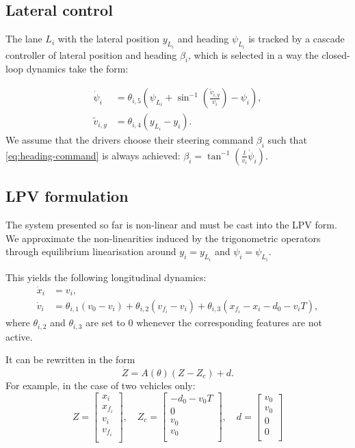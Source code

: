 \documentclass{article}
\begin{document}
\subsection{Lateral control}

The lane $L_i$ with the lateral position $y_{L_i}$ and heading $\psi_{L_i}$ is tracked by a cascade controller of lateral position and heading $\beta_i$, which is selected in a way the closed-loop dynamics take the form:

\begin{align}
	\label{eq:heading-command}
    \dot{\psi}_i &= \theta_{i,5}\left(\psi_{L_i}+\sin^{-1}\left(\frac{\tilde{v}_{i,y}}{v_i}\right)-\psi_i\right),\\
    \tilde{v}_{i,y} &= \theta_{i,4} (y_{L_i}-y_i). \nonumber
\end{align}
We assume that the drivers choose their steering command $\beta_i$ such that \eqref{eq:heading-command} is always achieved: $\beta_i = \tan^{-1}(\frac{l}{v_i}\dot{\psi}_i)$.

\subsection{LPV formulation}

The system presented so far is non-linear and must be cast into the LPV form. We approximate the non-linearities induced by the trigonometric operators through equilibrium linearisation around $y_i=y_{L_i}$ and $\psi_i=\psi_{L_i}$.

This yields the following longitudinal dynamics:
\begin{align*}
\dot{x}_i &= v_i,\\
\dot v_i &= \theta_{i,1} (v_0 - v_i) + \theta_{i,2} (v_{f_i} - v_i) + \theta_{i,3}(x_{f_i} - x_i - d_0 - v_i T),
\end{align*}
where $\theta_{i,2}$ and $\theta_{i,3}$ are set to $0$ whenever the corresponding features are not active.

It can be rewritten in the form $$\dot{Z} = A(\theta)(Z-Z_c) + d.$$ For example, in the case of two vehicles only:
\begin{equation*}
    Z = \begin{bmatrix}
x_i \\
x_{f_i} \\
v_i \\
v_{f_i} \\
\end{bmatrix}
,\quad
Z_c = \begin{bmatrix}
-d_0-v_0 T \\
0 \\
v_0\\
v_0 \\
\end{bmatrix}
,\quad
d = \begin{bmatrix}
v_0 \\
v_0 \\
0\\
0\\
\end{bmatrix}
\end{equation*}
\end{document}

